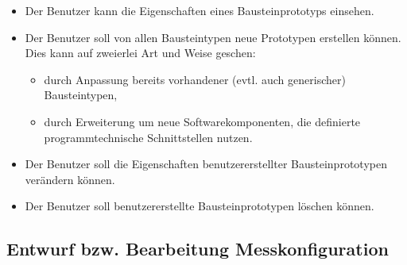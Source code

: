 \documentclass[parskip=full]{scrartcl}
\begin{document}
\begin{itemize}
	
	\item 
	\begin{MussKrit} 
		Der Benutzer kann die Eigenschaften eines Bausteinprototyps einsehen.
	\end{MussKrit}
	
	\item Der Benutzer soll von allen Bausteintypen neue Prototypen erstellen können. Dies kann auf zweierlei Art und Weise geschen: 
	
	\begin{itemize}
	
		\item 
		\begin{MussKrit} 
			durch Anpassung bereits vorhandener (evtl. auch generischer) Bausteintypen,
		\end{MussKrit}
		
		\item 
		\begin{SollKrit} 
			durch Erweiterung um neue Softwarekomponenten, die definierte programmtechnische Schnittstellen nutzen.
		\end{SollKrit}

	\end{itemize}
	
	\item 
	\begin{MussKrit}
		Der Benutzer soll die Eigenschaften benutzererstellter Bausteinprototypen verändern können.
	\end{MussKrit}
	
	\item 
	\begin{MussKrit}
		Der Benutzer soll benutzererstellte Bausteinprototypen löschen können.
	\end{MussKrit}
	
	
\end{itemize}

\subsection{Entwurf bzw. Bearbeitung Messkonfiguration}
\end{document}
